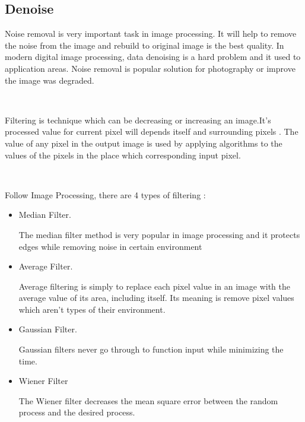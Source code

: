 
\subsection*{Denoise}

Noise removal is very important task in image processing. It will help to remove the noise from the image and rebuild to original image is the best quality. In modern digital image processing, data denoising is a hard problem and it used to application areas. Noise removal is popular solution for photography or improve the image was degraded.

\

Filtering is technique which can be decreasing or increasing an image.It's processed value for current pixel will depends itself and surrounding pixels . The value of any pixel in the output image is used by applying  algorithms to the values of the pixels in the place which corresponding input pixel.

\

Follow Image Processing, there are 4 types of filtering :

\begin{itemize}
\item Median Filter.

The median filter method is very popular in image processing and it protects edges while removing noise in certain environment
\item Average Filter.

Average filtering is simply to replace each pixel value in an image with the average value of its area, including itself. Its meaning is remove pixel values which aren't types of their environment.

\item Gaussian Filter.

Gaussian filters never go through to function input while minimizing the time.

 
\item Wiener Filter

The Wiener filter decreases the mean square error between the random process and the desired process.


\end{itemize} 












